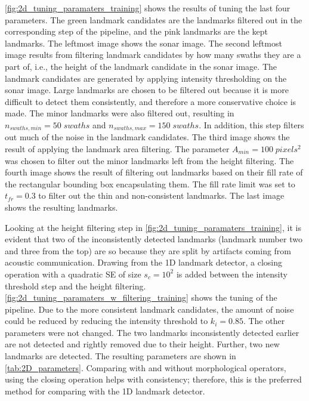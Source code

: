 \cref{fig:2d_tuning_paramaters_training} shows the results of tuning the last four parameters. The green landmark candidates are the landmarks filtered out in the corresponding step of the pipeline, and the pink landmarks are the kept landmarks. The leftmost image shows the sonar image. The second leftmost image results from filtering landmark candidates by how many swaths they are a part of, i.e., the height of the landmark candidate in the sonar image. The landmark candidates are generated by applying intensity thresholding on the sonar image. Large landmarks are chosen to be filtered out because it is more difficult to detect them consistently, and therefore a more conservative choice is made. The minor landmarks were also filtered out, resulting in $n_{swaths, min} = 50 \; swaths$ and $n_{swaths, max} = 150 \; swaths$. In addition, this step filters out much of the noise in the landmark candidates. The third image shows the result of applying the landmark area filtering. The parameter $A_{min} = 100 \;pixels^2$ was chosen to filter out the minor landmarks left from the height filtering. The fourth image shows the result of filtering out landmarks based on their fill rate of the rectangular bounding box encapsulating them. The fill rate limit was set to $t_{fr} = 0.3$ to filter out the thin and non-consistent landmarks. The last image shows the resulting landmarks.

Looking at the height filtering step in \cref{fig:2d_tuning_paramaters_training}, it is evident that two of the inconsistently detected landmarks (landmark number two and three from the top) are so because they are split by artifacts coming from acoustic communication. Drawing from the 1D landmark detector, a closing operation with a quadratic SE of size $s_c = 10^2$ is added between the intensity threshold step and the height filtering. \cref{fig:2d_tuning_paramaters_w_filtering_training} shows the tuning of the pipeline. Due to the more consistent landmark candidates, the amount of noise could be reduced by reducing the intensity threshold to $k_i = 0.85$. The other parameters were not changed. The two landmarks inconsistently detected earlier are not detected and rightly removed due to their height. Further, two new landmarks are detected. The resulting parameters are shown in \cref{tab:2D_parameters}. Comparing with and without morphological operators, using the closing operation helps with consistency; therefore, this is the preferred method for comparing with the 1D landmark detector. 

